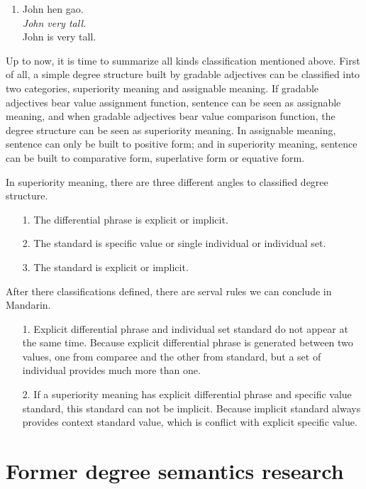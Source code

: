 \documentclass{ctexart}
\begin{document}
\begin{enumerate}[resume]
    \item \label{diff_tradition_comparative_example}
    John hen gao. \\
    \textit{John very tall.} \\
    John is very tall.
\end{enumerate}

Up to now, it is time to summarize all kinds classification mentioned above. First of all, a simple degree structure built by gradable adjectives can be classified into two categories, superiority meaning and assignable meaning. If gradable adjectives bear value assignment function, sentence can be seen as assignable meaning, and when gradable adjectives bear value comparison function, the degree structure can be seen as superiority meaning. In assignable meaning, sentence can only be built to positive form; and in superiority meaning, sentence can be built to comparative form, superlative form or equative form.

In superiority meaning, there are three different angles to classified degree structure. 

\begin{itemize}
    \item[1.] The differential phrase is explicit or implicit.
    \item[2.] The standard is specific value or single individual or individual set.
    \item[3.] The standard is explicit or implicit.
\end{itemize}

After there classifications defined, there are serval rules we can conclude in Mandarin.

\begin{itemize}
    \item[1.] Explicit differential phrase and individual set standard do not appear at the same time. Because explicit differential phrase is generated between two values, one from comparee and the other from standard, but a set of individual provides much more than one.
    \item[2.] If a superiority meaning has explicit differential phrase and specific value standard, this standard can not be implicit. Because implicit standard always provides context standard value, which is conflict with explicit specific value.
\end{itemize}

\section{Former degree semantics research}
\end{document}

